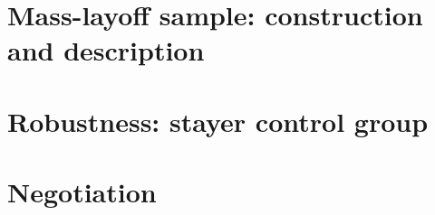 \documentclass[12pt,french,american,a4paper]{article}
\begin{document}
%


\clearpage
\section{Mass-layoff sample: construction and description \label{appsec:mlo}}


\clearpage
\section{Robustness: stayer control group\label{app:stayer_controls}}


\clearpage
\section{Negotiation\label{appsec:nego}}


\end{document}
